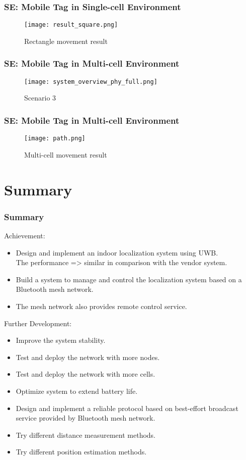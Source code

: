 \documentclass[10pt]{beamer}
\begin{document}
\begin{frame}
    \frametitle{SE: Mobile Tag in Single-cell Environment}
    \begin{figure}[H]
        \centering
        \texttt{[image: result\_square.png]}
        \caption{Rectangle movement result}
        \label{fig:result_rectangle}
    \end{figure}
\end{frame}

\begin{frame}
    \frametitle{SE: Mobile Tag in Multi-cell Environment}
    \begin{figure}[H]
        \centering
        \texttt{[image: system\_overview\_phy\_full.png]}
        \caption{Scenario 3}
        \label{fig:scenario_3}
    \end{figure}
\end{frame}

\begin{frame}
    \frametitle{SE: Mobile Tag in Multi-cell Environment}
    \begin{figure}[H]
        \centering
        \texttt{[image: path.png]}
        \caption{Multi-cell movement result}
        \label{fig:multi_cell_movement_result}
    \end{figure}
\end{frame}

\section{Summary}
\begin{frame}
    \frametitle{Summary}
    Achievement:
    \begin{itemize}
        \item Design and implement an indoor localization system using UWB. \\The performance => similar in comparison with the vendor system.
        \item Build a system to manage and control the localization system based on a Bluetooth mesh network.
        \item The mesh network also provides remote control service.
    \end{itemize}
    Further Development:
    \begin{itemize}
        \item Improve the system stability.
        \item Test and deploy the network with more nodes.
        \item Test and deploy the network with more cells.
        \item Optimize system to extend battery life.
        \item Design and implement a reliable protocol based on best-effort broadcast service provided by Bluetooth mesh network.
        \item Try different distance measurement methods.
        \item Try different position estimation methods.
    \end{itemize}
\end{frame}
\end{document}
